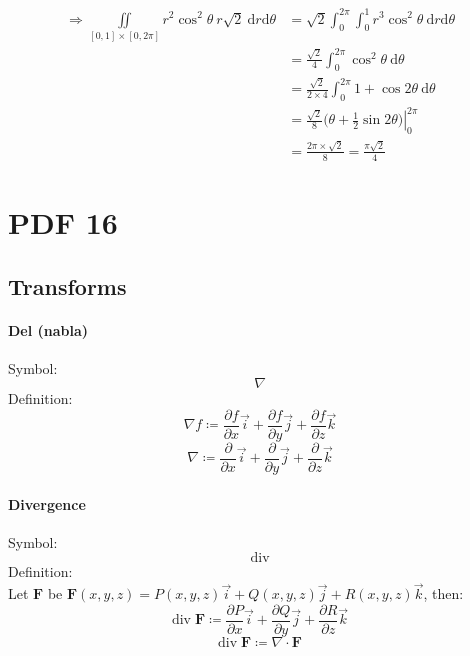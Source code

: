 \documentclass[12pt, fleqn]{book}
\newcommand{\D}{\mathrm{d}}
\begin{document}
 				\begin{equation*}
 					\begin{split}
	 					\Rightarrow \iint\limits_{[0, 1] \times [0, 2\pi]}
 						r^2\cos^2\theta \ r\sqrt{2} \ \D r \D \theta
 						 & = \sqrt{2} \int_{0}^{2\pi} \int_{0}^{1} r^3\cos^2\theta \ \D r \D \theta \\
 						 & = \frac{\sqrt{2}}{4} \int_{0}^{2\pi} \cos^2\theta \ \D \theta \\
 						 & = \frac{\sqrt{2}}{2 \times 4} \int_{0}^{2\pi} 1 + \cos2\theta \ \D \theta \\
 						 & = \frac{\sqrt{2}}{8} \left.\big(\theta + \frac{1}{2}\sin2\theta\big)\right|_0^{2\pi} \\
 						 & = \frac{2\pi \times \sqrt{2}}{8} = \frac{\pi\sqrt{2}}{4}
 					\end{split}
 				\end{equation*}
\chapter{PDF 16}\label{pdf16}
	\section{Transforms}
		\subsubsection{Del (nabla)}
			Symbol:
			\begin{equation}
				\nabla
			\end{equation}
			Definition:
			\begin{equation}
				\nabla f \coloneqq \frac{\partial f}{\partial x}\vec{i} + \frac{\partial f}{\partial y}\vec{j} + \frac{\partial f}{\partial z}\vec{k}
			\end{equation}
		    \begin{equation}
		    	\nabla \coloneqq \frac{\partial}{\partial x}\vec{i} + \frac{\partial}{\partial y}\vec{j} + \frac{\partial}{\partial z}\vec{k}
		    \end{equation}
	    \subsubsection{Divergence}
	    	Symbol:
	    	\begin{equation}
	    		\mathrm{div}
	    	\end{equation}
    		Definition: \\
    		Let $\mathbf{F}$ be $\mathbf{F}(x, y, z) = P(x, y, z)\vec{i} + Q(x, y, z)\vec{j} + R(x, y, z)\vec{k}$, then:
    		\begin{equation}
    			\mathrm{div} \; \mathbf{F} \coloneqq \frac{\partial P}{\partial x}\vec{i} + \frac{\partial Q}{\partial y}\vec{j} + \frac{\partial R}{\partial z}\vec{k}
    		\end{equation}
    		\begin{equation}
    			\mathrm{div} \; \mathbf{F} \coloneqq \nabla \cdot \mathbf{F}
    		\end{equation}
\end{document}
